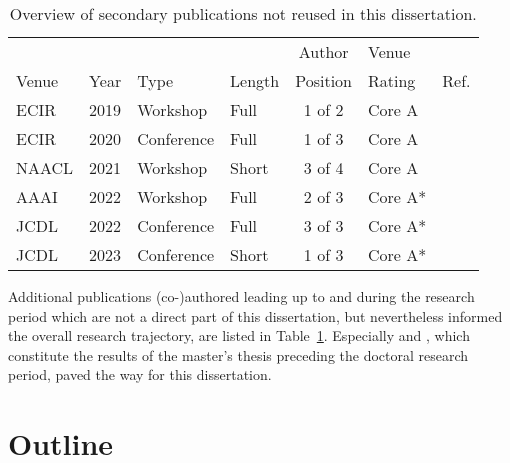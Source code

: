 \begin{table}[tb]
\centering
  \caption{Overview of secondary publications not reused in this dissertation.}
  \label{tab:secondarypublicationoverview}
  \begin{tabular}{llllclr}
    \hline
    \ & \ & \ & \ & Author & Venue & \ \\
    Venue & Year & Type & Length & Position & Rating & Ref. \\
    \hline
    ECIR & 2019 & Workshop & Full & 1 of 2 & Core A & \cite{Saier2019} \\
    ECIR & 2020 & Conference & Full & 1 of 3 & Core A & \cite{Saier2020a} \\
    NAACL & 2021 & Workshop & Short & 3 of 4 & Core A & \cite{Krause2021} \\
    AAAI & 2022 & Workshop & Full & 2 of 3 & Core A* & \cite{Shapiro2022} \\
    JCDL & 2022 & Conference & Full & 3 of 3 & Core A* & \cite{Nishioka2022} \\
    JCDL & 2023 & Conference & Short & 1 of 3 & Core A* & \cite{Saier2023cocon} \\
    \hline
    \end{tabular}
\end{table}

Additional publications (co-)authored leading up to and during the research period which are not a direct part of this dissertation, but nevertheless informed the overall research trajectory, are listed in Table~\ref{tab:secondarypublicationoverview}. Especially \cite{Saier2019} and \cite{Krause2021}, which constitute the results of the master's thesis preceding the doctoral research period, paved the way for this dissertation.

\section{Outline}
\Blindtext[1]
